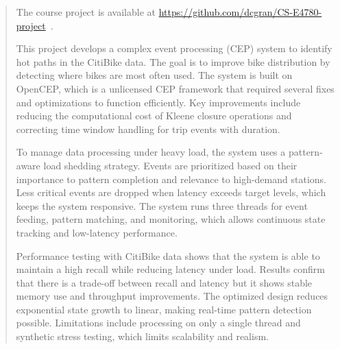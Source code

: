 \documentclass[sigconf]{acmart}
\begin{document}
\begin{abstract}

  The course project is available at \url{https://github.com/dcgran/CS-E4780-project}~\cite{CS-E4780-project}.

  This project develops a complex event processing (CEP) system to identify hot paths in the CitiBike data. The goal is to improve bike distribution by detecting where bikes are most often used. The system is built on OpenCEP, which is a unlicensed CEP framework that required several fixes and optimizations to function efficiently. Key improvements include reducing the computational cost of Kleene closure operations and correcting time window handling for trip events with duration.

  To manage data processing under heavy load, the system uses a pattern-aware load shedding strategy. Events are prioritized based on their importance to pattern completion and relevance to high-demand stations. Less critical events are dropped when latency exceeds target levels, which keeps the system responsive. The system runs three threads for event feeding, pattern matching, and monitoring, which allows continuous state tracking and low-latency performance.

  Performance testing with CitiBike data shows that the system is able to maintain a high recall while reducing latency under load. Results confirm that there is a trade-off between recall and latency but it shows stable memory use and throughput improvements. The optimized design reduces exponential state growth to linear, making real-time pattern detection possible. Limitations include processing on only a single thread and synthetic stress testing, which limits scalability and realism.

\end{abstract}


\end{document}
